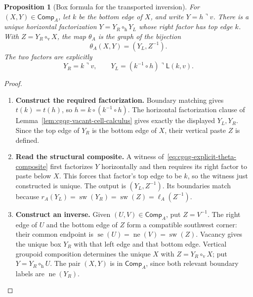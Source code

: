 \documentclass[oneside]{article}
\newcommand{\trcorner}{\mathbin{\urcorner}}
\newcommand{\leftedge}[2]{\mathsf{L}(#1,#2)}
\newcommand{\boxne}[1]{\operatorname{ne}(#1)}
\newcommand{\boxsw}[1]{\operatorname{sw}(#1)}
\newcommand{\boxse}[1]{\operatorname{se}(#1)}
\theoremstyle{plain}
\newtheorem{proposition}[theorem]{Proposition}
\theoremstyle{definition}
\theoremstyle{remark}
\begin{document}
\begin{proposition}[Box formula for the transported inversion]
\label{prop:cgqg-explicit-theta-boxes}
For \((X,Y)\in\mathsf{Comp}_A\), let \(k\) be the bottom edge of
\(X\), and write \(Y=h\trcorner v\). There is a unique horizontal
factorization \(Y=Y_R\circ_{\mathrm h}Y_L\) whose right factor has
top edge \(k\). With \(Z=Y_R\circ_{\mathrm v}X\), the map
\(\theta_A\) is the graph of the bijection
\begin{equation}
 \theta_A(X,Y)=(Y_L,Z^{-1}).
 \label{eq:cgqg-explicit-theta-box-formula}
\end{equation}
The two factors are explicitly
\[
 Y_R=k\trcorner v,
 \qquad Y_L=(k^{-1}\circ h)\trcorner\leftedge{k}{v}.
\]
\end{proposition}
\begin{proof}
    \leavevmode
    \begin{enumerate}[beginpenalty=10000]
        \item \textbf{Construct the required factorization.}
        Boundary matching gives \(t(k)=t(h)\), so
        \(h=k\circ(k^{-1}\circ h)\). The horizontal factorization
        clause of Lemma~\ref{lem:cgqg-vacant-cell-calculus} gives
        exactly the displayed \(Y_L,Y_R\). Since the top edge of
        \(Y_R\) is the bottom edge of \(X\), their vertical paste
        \(Z\) is defined.

        \item \textbf{Read the structural composite.}
        A witness of~\eqref{eq:cgqg-explicit-theta-composite} first
        factorizes \(Y\) horizontally and then requires its right
        factor to paste below \(X\). This forces that factor's top
        edge to be \(k\), so the witness just constructed is unique.
        The output is \((Y_L,Z^{-1})\). Its boundaries match because
        \(r_A(Y_L)=\boxsw{Y_R}=\boxsw{Z}=\ell_A(Z^{-1})\).

        \item \textbf{Construct an inverse.}
        Given \((U,V)\in\mathsf{Comp}_A\), put \(Z=V^{-1}\).
        The right edge of \(U\) and the bottom edge of \(Z\) form
        a compatible southwest corner: their common endpoint is
        \(\boxse{U}=\boxne{V}=\boxsw{Z}\). Vacancy gives the unique box
        \(Y_R\) with that left edge and that bottom edge.
        Vertical groupoid composition determines the unique \(X\)
        with \(Z=Y_R\circ_{\mathrm v}X\); put
        \(Y=Y_R\circ_{\mathrm h}U\). The pair \((X,Y)\) is in
        \(\mathsf{Comp}_A\), since both relevant boundary labels are
        \(\boxne{Y_R}\).


\end{enumerate}
\end{proof}
\end{document}
